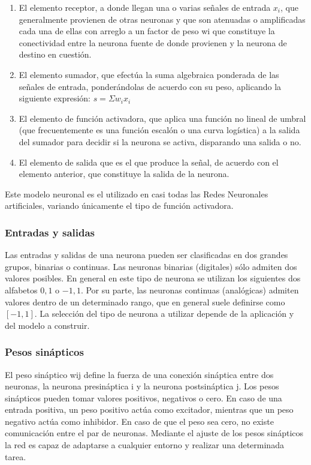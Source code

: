 \begin{enumerate}
	\item El elemento receptor, a donde llegan una o varias
	se\~nales de entrada $x_i$, que generalmente provienen de otras
	neuronas y que son atenuadas o amplificadas cada una de
	ellas con arreglo a un factor de peso wi que constituye la
	conectividad entre la neurona fuente de donde provienen y la
	neurona de destino en cuesti\'on.

	\item El elemento sumador, que efect\'ua la suma algebraica
	ponderada de las se\~nales de entrada, ponder\'andolas de
	acuerdo con su peso, aplicando la siguiente expresi\'on: $s=\Sigma w_i x_i$

	\item El elemento de funci\'on activadora, que aplica una
	funci\'on no lineal de umbral (que frecuentemente es una
	funci\'on escal\'on o una curva log\'istica) a la salida del
	sumador para decidir si la neurona se activa, disparando una
	salida o no.

	\item El elemento de salida que es el que produce la se\~nal,
	de acuerdo con el elemento anterior, que constituye la
	salida de la neurona.
\end{enumerate}

Este modelo neuronal es el utilizado en casi todas las
Redes Neuronales artificiales, variando \'unicamente el tipo
de funci\'on activadora.

\subsubsection{Entradas y salidas}
Las entradas y salidas de una neurona pueden ser clasificadas en dos
grandes grupos, binarias o continuas. Las neuronas binarias (digitales) s\'olo
admiten dos valores posibles. En general en este tipo de neurona se utilizan los
siguientes dos alfabetos ${0,1}$ o ${-1,1}$. Por su parte, las neuronas continuas
(anal\'ogicas) admiten valores dentro de un determinado rango, que en general
suele definirse como $[-1, 1]$.
La selecci\'on del tipo de neurona a utilizar depende de la aplicaci\'on y del
modelo a construir.

\subsubsection{Pesos sin\'apticos}
El peso sin\'aptico wij define la fuerza de una conexi\'on sin\'aptica entre dos
neuronas, la neurona presin\'aptica i y la neurona postsin\'aptica j. Los pesos
sin\'apticos pueden tomar valores positivos, negativos o cero. En caso de una
entrada positiva, un peso positivo act\'ua como excitador, mientras que un peso
negativo act\'ua como inhibidor. En caso de que el peso sea cero, no existe
comunicaci\'on entre el par de neuronas.
Mediante el ajuste de los pesos sin\'apticos la red es capaz de adaptarse a
cualquier entorno y realizar una determinada tarea.

